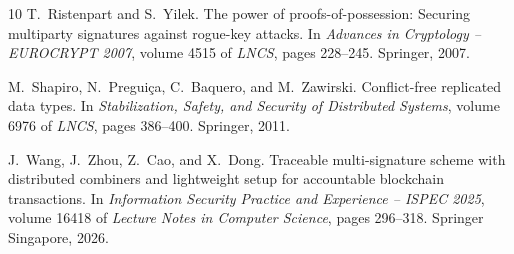 \documentclass[11pt]{article}
\theoremstyle{definition}
\begin{document}
\begin{thebibliography}{10}
T.~Ristenpart and S.~Yilek.
\newblock The power of proofs-of-possession: Securing multiparty signatures
  against rogue-key attacks.
\newblock In {\em Advances in Cryptology -- EUROCRYPT 2007}, volume 4515 of
  {\em LNCS}, pages 228--245. Springer, 2007.

M.~Shapiro, N.~Pregui{\c{c}}a, C.~Baquero, and M.~Zawirski.
\newblock Conflict-free replicated data types.
\newblock In {\em Stabilization, Safety, and Security of Distributed Systems},
  volume 6976 of {\em LNCS}, pages 386--400. Springer, 2011.

J.~Wang, J.~Zhou, Z.~Cao, and X.~Dong.
\newblock Traceable multi-signature scheme with distributed combiners and
  lightweight setup for accountable blockchain transactions.
\newblock In {\em Information Security Practice and Experience -- ISPEC 2025},
  volume 16418 of {\em Lecture Notes in Computer Science}, pages 296--318.
  Springer Singapore, 2026.

\end{thebibliography}
\end{document}
